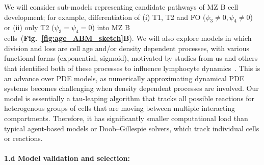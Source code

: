 \documentclass[11pt]{article}
\newcommand{\khi}{\ensuremath{\text{Ki67}^\text{hi}}~}
\newcommand{\para}[1]{\vspace*{-4.5mm}\paragraph{#1}}
\begin{document}
We will consider sub-models representing candidate pathways of MZ B cell development; for example, differentiation of (i) T1, T2 and FO ($\psi_{3}\neq0, \psi_{4}\neq0$) or (ii) only T2 ($\psi_{3} = \psi_{4} = 0$) into MZ B cells~(\textbf{Fig.~\ref{fig:age_ABM_sketch}B}).
We will also explore models in which division and loss are cell age and/or density dependent processes, with various functional forms (exponential, sigmoid), motivated by studies from us and others that identified both of these processes to influence lymphocyte dynamics~\cite{Rane_2022, Rane_2018, Hogan_2015,  De_Boer_2013, DeBoer_2001, Min_2003, Freitas_1995}.
This is an advance  over PDE models, as numerically approximating dynamical PDE systems becomes challenging when density dependent processes are involved.
Our model is essentially a tau-leaping algorithm that tracks all possible reactions for heterogenous groups of cells that are moving between multiple interacting compartments.
Therefore, it has significantly smaller computational load than typical agent-based models or Doob–Gillespie solvers, which track individual cells  or  reactions.

%


\para{{1.d Model validation and selection:}} \label{sec:stats-validation}
\end{document}
